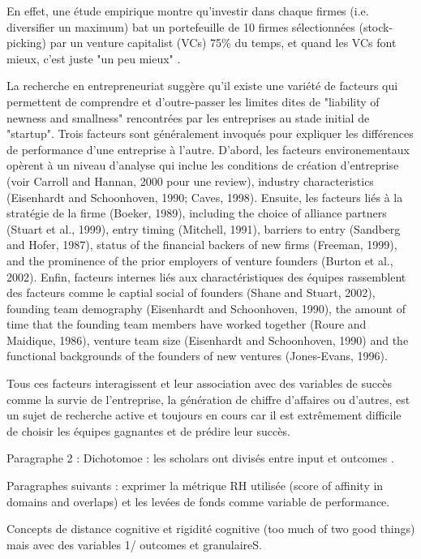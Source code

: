 \documentclass[11pt]{article}
\begin{document}
En effet, une étude empirique montre qu'investir dans chaque firmes (i.e. diversifier un maximum) bat un portefeuille de 10 firmes sélectionnées (stock-picking) par un venture capitalist (VCs) 75\% du temps, et quand les VCs font mieux, c'est juste "un peu mieux" \citep{othman2020angelistdata}.

La recherche en entrepreneuriat suggère qu'il existe une variété de facteurs qui permettent de comprendre et d'outre-passer les limites dites de "liability of newness and smallness" rencontrées par les entreprises au stade initial de "startup". Trois facteurs sont généralement invoqués pour expliquer les différences de performance d'une entreprise à l'autre. D'abord, les facteurs environementaux opèrent à un niveau d'analyse qui inclue les conditions de création d'entreprise (voir Carroll and Hannan, 2000 pour une review), industry characteristics (Eisenhardt and Schoonhoven, 1990; Caves, 1998). Ensuite, les facteurs liés à la stratégie de la firme (Boeker, 1989), including the choice of alliance partners (Stuart et al., 1999), entry timing (Mitchell, 1991), barriers to entry (Sandberg and Hofer, 1987), status of the financial backers of new firms (Freeman, 1999), and the prominence of the prior employers of venture founders (Burton et al., 2002). Enfin, facteurs internes liés aux charactéristiques des équipes rassemblent des facteurs comme le captial social of founders (Shane and Stuart, 2002), founding team demography (Eisenhardt and Schoonhoven, 1990), the amount of time that the founding team members have worked together (Roure and Maidique, 1986), venture team size (Eisenhardt and Schoonhoven, 1990) and the functional backgrounds of the founders of new ventures (Jones-Evans, 1996).

Tous ces facteurs interagissent et leur association avec des variables de succès comme la survie de l'entreprise, la génération de chiffre d'affaires ou d'autres, est un sujet de recherche active et toujours en cours car il est extrêmement difficile de choisir les équipes gagnantes et de prédire leur succès.

Paragraphe 2 : Dichotomoe : les scholars ont divisés entre input et outcomes \citep{marvel2016human}.

Paragraphes suivants : exprimer la métrique RH utilisée (score of affinity in domains and overlaps) et les levées de fonds comme variable de performance.

Concepts de distance cognitive et rigidité cognitive (too much of two good things) mais avec des variables 1/ outcomes et granulaireS.
\end{document}
